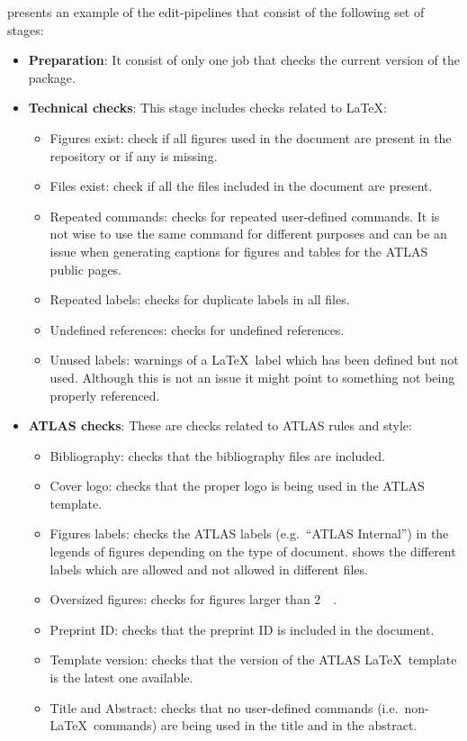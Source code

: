 presents an example of the edit-pipelines that consist of the following set of stages:
\begin{itemize}
\item \textbf{Preparation}: It consist of only one job that checks the current version of the \pogitlab package.

\item \textbf{Technical checks}: This stage includes checks related to \LaTeX: %
  \begin{itemize}
  \item Figures exist: check if all figures used in the document are present in the repository or if any is missing.
  \item Files exist: check if all the  files included in the document are present.
  \item Repeated commands: checks for repeated user-defined commands.
    It is not wise to use the same command for different purposes and can be an issue when generating captions for figures and tables for the ATLAS public pages.
  \item Repeated labels: checks for duplicate labels in all  files.
  \item Undefined references: checks for undefined references.
  \item Unused labels: warnings of a \LaTeX\ label which has been defined but not used.
    Although this is not an issue it might point to something not being properly referenced.
  \end{itemize}

\item \textbf{ATLAS checks}: These are checks related to ATLAS rules and style:
  \begin{itemize}
  \item Bibliography: checks that the bibliography files are included.
  \item Cover logo: checks that the proper logo is being used in the ATLAS template.
  \item Figures labels: checks the ATLAS labels (e.g.\ \enquote{ATLAS Internal}) in the legends of figures depending on the type of document.  shows the different labels which are allowed and not allowed in different files.
  \item Oversized figures: checks for figures larger than \SI{2}{\mega\byte}.
  \item Preprint ID\@: checks that the preprint ID is included in the document.
  \item Template version: checks that the version of the ATLAS \LaTeX\ template is the latest one available.
  \item Title and Abstract: checks that no user-defined commands (i.e.\ non-\LaTeX\ commands) are being used in the title and in the abstract.
  \end{itemize}


\end{itemize}
